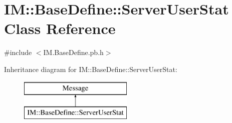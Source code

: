 \hypertarget{class_i_m_1_1_base_define_1_1_server_user_stat}{}\section{I\+M\+:\+:Base\+Define\+:\+:Server\+User\+Stat Class Reference}
\label{class_i_m_1_1_base_define_1_1_server_user_stat}


{\ttfamily \#include $<$I\+M.\+Base\+Define.\+pb.\+h$>$}

Inheritance diagram for I\+M\+:\+:Base\+Define\+:\+:Server\+User\+Stat\+:\begin{figure}[H]
\begin{center}
\leavevmode
\includegraphics[height=2.000000cm]{class_i_m_1_1_base_define_1_1_server_user_stat}
\end{center}
\end{figure}
